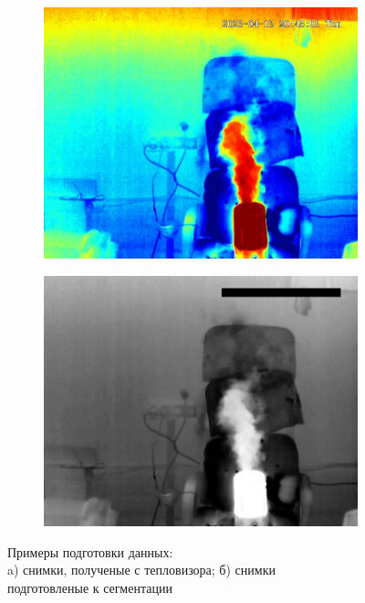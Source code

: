 \documentclass[t]{beamer}
\begin{document}
\begin{frame}
\begin{figure}[ht!]
							\begin{subfigure}{0.3\textwidth}
									\centering
									\includegraphics[width = \textwidth]{image/examp222}
									\caption{}
							\end{subfigure}
							\begin{subfigure}{0.3\textwidth}
								\centering
								\includegraphics[width = \textwidth]{image/1tep}
								\caption{}
							\end{subfigure}
							\centering
							\vspace*{-0.25cm}
							\caption{Примеры подготовки данных: \\a) снимки, полученые с тепловизора; б) снимки\\ подготовленые к сегментации}
							\label{fig:Examples}
						\end{figure}

		
	\end{frame}
\end{document}
